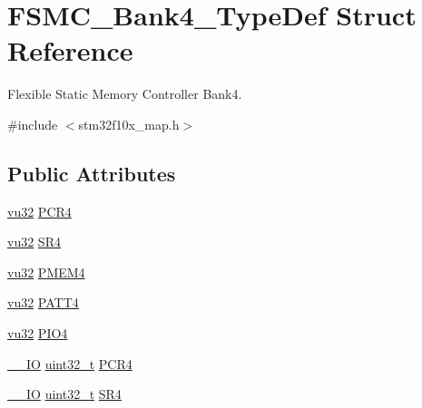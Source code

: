 \hypertarget{struct_f_s_m_c___bank4___type_def}{}\section{F\+S\+M\+C\+\_\+\+Bank4\+\_\+\+Type\+Def Struct Reference}
\label{struct_f_s_m_c___bank4___type_def}


Flexible Static Memory Controller Bank4.  




{\ttfamily \#include $<$stm32f10x\+\_\+map.\+h$>$}

\subsection*{Public Attributes}
\begin{DoxyCompactItemize}
\item 
\hyperlink{agilefox_2library_2inc_2stm32f10x__type_8h_a6e2761f0a1011f84ed96b946f2c8a563}{vu32} \hyperlink{struct_f_s_m_c___bank4___type_def_a52bca427553f7e53a643f61918464575}{P\+C\+R4}
\item 
\hyperlink{agilefox_2library_2inc_2stm32f10x__type_8h_a6e2761f0a1011f84ed96b946f2c8a563}{vu32} \hyperlink{struct_f_s_m_c___bank4___type_def_a3f85877aa8af4fbdb40e3e54a2575b48}{S\+R4}
\item 
\hyperlink{agilefox_2library_2inc_2stm32f10x__type_8h_a6e2761f0a1011f84ed96b946f2c8a563}{vu32} \hyperlink{struct_f_s_m_c___bank4___type_def_afd50706501facd4259b8aa7f85afaeae}{P\+M\+E\+M4}
\item 
\hyperlink{agilefox_2library_2inc_2stm32f10x__type_8h_a6e2761f0a1011f84ed96b946f2c8a563}{vu32} \hyperlink{struct_f_s_m_c___bank4___type_def_ac6d400ebf96dbe451f01690a6987e89a}{P\+A\+T\+T4}
\item 
\hyperlink{agilefox_2library_2inc_2stm32f10x__type_8h_a6e2761f0a1011f84ed96b946f2c8a563}{vu32} \hyperlink{struct_f_s_m_c___bank4___type_def_a79d11d090c377cd6fd77d40abdfff475}{P\+I\+O4}
\item 
\hyperlink{group___c_m_s_i_s___c_m3__core__definitions_gaec43007d9998a0a0e01faede4133d6be}{\+\_\+\+\_\+\+IO} \hyperlink{_p_e___types_8h_a33594304e786b158f3fb30289278f5af}{uint32\+\_\+t} \hyperlink{struct_f_s_m_c___bank4___type_def_a0470b5bbb53e9f1bbde09829371eb72f}{P\+C\+R4}
\item 
\hyperlink{group___c_m_s_i_s___c_m3__core__definitions_gaec43007d9998a0a0e01faede4133d6be}{\+\_\+\+\_\+\+IO} \hyperlink{_p_e___types_8h_a33594304e786b158f3fb30289278f5af}{uint32\+\_\+t} \hyperlink{struct_f_s_m_c___bank4___type_def_a1e0f09be7fa48bb7b14233866da1dd9f}{S\+R4}

\end{DoxyCompactItemize}
